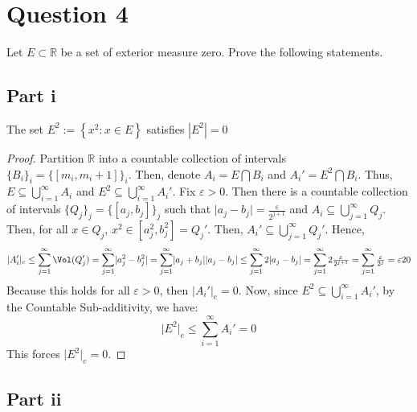 \section{Question 4}

\begin{question}
    Let $E \subset \mathbb{R}$ be a set of exterior measure zero. Prove the following statements.
\end{question}

\subsection{Part i}

\begin{question}
    The set $E^2:=\left\{x^2: x \in E\right\}$ satisfies $\left|E^2\right|=0$
\end{question}

\begin{answer}
    \begin{proof}
        Partition $\mathbb{R}$ into a countable collection of intervals $\{B_i\}_i = \{[m_i,m_i+1]\}_i$. Then, denote $A_i = E\bigcap B_i$ and $A_i' = E^2 \bigcap B_i$. Thus, $E \subseteq \bigcup_{i =1}^{\infty} A_i$ and $E^2 \subseteq \bigcup_{i =1}^{\infty} A_i'$. Fix $\varepsilon > 0$. Then there is a countable collection of intervals $\{Q_j\}_j = \{[a_j,b_j]\}_j$ such that $\lvert a_j - b_j \rvert = \tfrac{\varepsilon}{2^{j+1}}$ and $A_i \subseteq \bigcup_{j=1}^{\infty}Q_j$. Then, for all $x \in Q_j$, $x^2 \in [a_j^2,b_j^2] = Q_j'$. Then, $A_i' \subseteq \bigcup_{j=1}^{\infty}Q_j'$. Hence, $$\lvert A_i' \rvert_e \leq \sum_{j = 1}^{\infty}\Vol(Q_j') = \sum_{j = 1}^{\infty} \lvert a_j^2 - b_j^2\rvert = \sum_{j = 1}^{\infty} \lvert a_j + b_j\rvert \lvert a_j - b_j \rvert \leq \sum_{j = 1}^{\infty} 2\lvert a_j - b_j\rvert = \sum_{j = 1}^{\infty} 2\tfrac{\varepsilon}{2^{j+1}} = \sum_{j = 1}^{\infty} \tfrac{\varepsilon}{2^j} = \varepsilon20
        $$
        Because this holds for all $\varepsilon > 0$, then $\lvert A_i' \rvert_e = 0$. Now, since $E^2 \subseteq \bigcup_{i =1}^{\infty} A_i'$, by the Countable Sub-additivity, we have:
        \begin{equation}
            \lvert E^2 \rvert_e \leq \sum_{i = 1}^{\infty} A_i' = 0
        \end{equation}
        This forces $\lvert E^2 \rvert_e = 0$.
    \end{proof}
\end{answer}

\subsection{Part ii}

